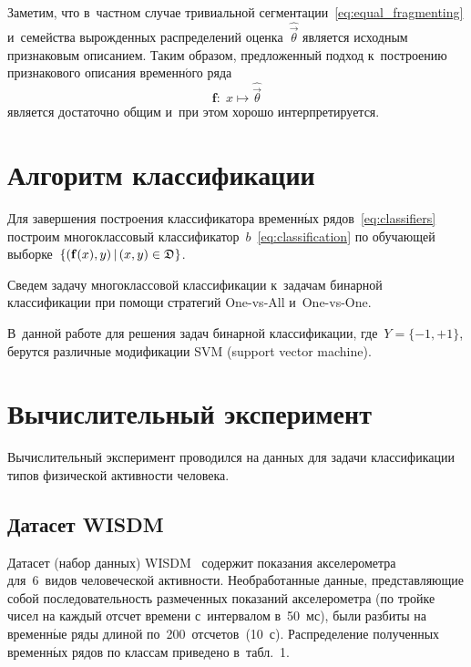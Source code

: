 \begin{multicols}{2}
Заметим, что в~частном случае тривиальной сегментации~\eqref{eq:equal_fragmenting} и~семейства вырожденных распределений оценка~$\hat{\vec\theta}$ является исходным признаковым описанием.
Таким образом, предложенный подход к~построению признакового описания временн$\acute{\mbox{о}}$го ряда
\begin{equation*}
\mathbf{f}:\;x\mapsto\hat{\vec\theta}
\end{equation*}
является достаточно общим и~при этом хорошо интерпретируется.


\section{Алгоритм классификации}

Для завершения построения классификатора временн$\acute{\mbox{ы}}$х 
рядов~\eqref{eq:classifiers} построим многоклассовый 
классификатор~$b$~\eqref{eq:classification} по обучающей 
выборке~$\left\{(\mathbf{f}(x),y)\,|\,(x,y)\hm\in\mathfrak{D}\right\}$.

Сведем задачу многоклассовой классификации к~задачам бинарной классификации 
при помощи стратегий One-vs-All и~One-vs-One.

В~данной работе для решения задач бинарной классификации, где~$Y=\{-1,+1\}$, 
берутся различные модификации SVM (support vector machine).

\vspace*{-6pt}


\section{Вычислительный эксперимент}

\vspace*{-2pt}

Вычислительный эксперимент проводился на данных для задачи классификации 
типов физической активности человека.

\vspace*{-6pt}

\subsection{Датасет WISDM}

\vspace*{-2pt}

Датасет (набор данных) WISDM~\cite{Kwapisz:2011:ARU:1964897.1964918} содержит 
показания акселерометра для~6~видов человеческой активности.
Необработанные данные, пред\-став\-ля\-ющие собой последовательность размеченных 
показаний акселерометра (по тройке чисел на каждый отсчет времени с~интервалом 
в~50~мс), были разбиты на временн$\acute{\mbox{ы}}$е ряды длиной 
по~200~отсчетов~(10~с).
Распределение полученных временн$\acute{\mbox{ы}}$х рядов по классам приведено 
в~табл.~1.


\end{multicols}
